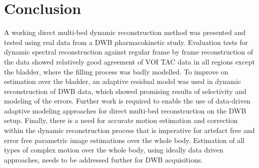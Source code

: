\section{Conclusion}
A working direct multi-bed dynamic reconstruction method was presented and tested using real data from a DWB pharmacokinetic study. Evaluation tests for dynamic spectral reconstruction against regular frame by frame reconstruction of the data showed relatively good agreement of VOI TAC data in all regions except the bladder, where the filling process was badly modelled. 
To improve on estimation over the bladder, an adaptive residual model was used in dynamic reconstruction of DWB data, which showed promising results of selectivity and modeling of the errors. Further work is required to enable the use of data-driven adaptive modeling approaches for direct multi-bed reconstruction on the DWB setup. 
Finally, there is a need for accurate motion estimation and correction within the dynamic reconstruction process that is imperative for artefact free and error free parametric image estimations over the whole body.
Estimation of all types of complex motion over the whole body, using ideally data driven approaches, needs to be addressed further for DWB acquisitions.